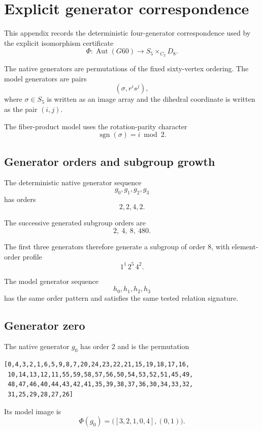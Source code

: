 \section{Explicit generator correspondence}
\label{app:generator-correspondence}

This appendix records the deterministic four-generator correspondence
used by the explicit isomorphism certificate
\[
\Phi\colon
\operatorname{Aut}(G60)
\longrightarrow
S_5\times_{C_2}D_8.
\]

The native generators are permutations of the fixed sixty-vertex
ordering. The model generators are pairs
\[
(\sigma,r^i s^j),
\]
where $\sigma\in S_5$ is written as an image array and the dihedral
coordinate is written as the pair $(i,j)$.

The fiber-product model uses the rotation-parity character
\[
\operatorname{sgn}(\sigma)=i\bmod 2.
\]

\subsection{Generator orders and subgroup growth}

The deterministic native generator sequence
\[
g_0,g_1,g_2,g_3
\]
has orders
\[
2,2,4,2.
\]

The successive generated subgroup orders are
\[
2,\ 4,\ 8,\ 480.
\]

The first three generators therefore generate a subgroup of order $8$,
with element-order profile
\[
1^1\,2^5\,4^2.
\]

The model generator sequence
\[
h_0,h_1,h_2,h_3
\]
has the same order pattern and satisfies the same tested relation
signature.

\subsection{Generator zero}

The native generator $g_0$ has order $2$ and is the permutation

\begin{small}
\begin{verbatim}
[0,4,3,2,1,6,5,9,8,7,20,24,23,22,21,15,19,18,17,16,
 10,14,13,12,11,55,59,58,57,56,50,54,53,52,51,45,49,
 48,47,46,40,44,43,42,41,35,39,38,37,36,30,34,33,32,
 31,25,29,28,27,26]
\end{verbatim}
\end{small}

Its model image is
\[
\Phi(g_0)
=
\bigl(
[3,2,1,0,4],
(0,1)
\bigr).
\]

